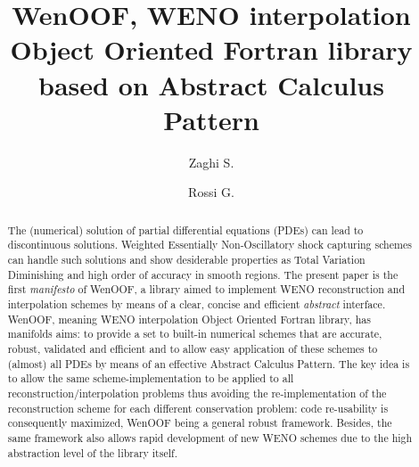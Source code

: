 \documentclass[pdftex,preprint,3p,times,numbers]{elsarticle}
\begin{document}
\begin{frontmatter}

\title{WenOOF, WENO interpolation Object Oriented Fortran library based on Abstract Calculus Pattern}

\author[insean]{Zaghi S.}
\address[insean]{CNR-INSEAN, Istituto Nazionale per Studi ed Esperienze di Architettura Navale, Via di Vallerano 139, Rome, Italy, 00128}

\author[dima]{Rossi G.}
\address[dima]{Dipartimento di Ingegneria Meccanica e Aerospaziale, Universit\'{a} di Roma ``Sapienza'', Via Eudossiana 18, Rome, Italy, 00184}

\begin{abstract}
  The (numerical) solution of partial differential equations (PDEs) can lead to discontinuous solutions. Weighted Essentially Non-Oscillatory shock capturing schemes can handle such solutions and show desiderable properties as Total Variation Diminishing and high order of accuracy in smooth regions. The present paper is the first \emph{manifesto} of WenOOF, a library aimed to implement WENO reconstruction and interpolation schemes by means of a clear, concise and efficient \emph{abstract} interface. WenOOF, meaning WENO interpolation Object Oriented Fortran library, has manifolds aims: to provide a set to built-in numerical schemes that are accurate, robust, validated and efficient and to allow easy application of these schemes to (almost) all PDEs by means of an effective Abstract Calculus Pattern. The key idea is to allow the same scheme-implementation to be applied to all reconstruction/interpolation problems thus avoiding the re-implementation of the reconstruction scheme for each different conservation problem: code re-usability is consequently maximized, WenOOF being a general robust framework. Besides, the same framework also allows rapid development of new WENO schemes due to the high abstraction level of the library itself.


\end{abstract}
\end{frontmatter}
\end{document}
